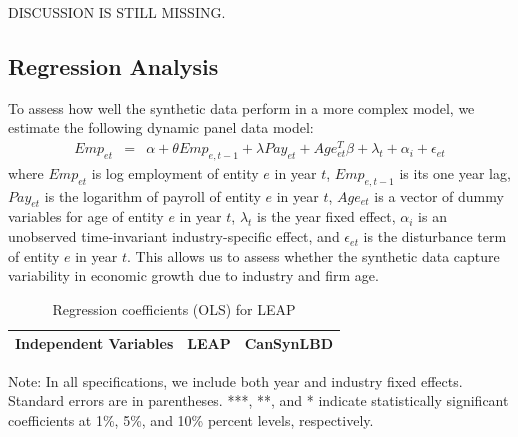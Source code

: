 DISCUSSION IS STILL MISSING.

\subsection{Regression Analysis}

To assess how well the synthetic data perform in a more complex model, we estimate  the following dynamic panel data model:
\begin{eqnarray}	
Emp_{et} & = & \alpha + \theta Emp_{e,t-1} + \lambda Pay_{et} + Age_{et}^{T}\beta + \lambda_t + \alpha_i + \epsilon_{et}
\end{eqnarray}
where $Emp_{et}$ is log employment of entity $e$ in year $t$, $Emp_{e,t-1}$ is its one year lag, $Pay_{et}$ is the logarithm of payroll of entity $e$ in year $t$, $Age_{et}$ is a vector of dummy variables for age of entity $e$ in year $t$, $\lambda_t$ is the year fixed effect, $\alpha_i$ is an unobserved time-invariant industry-specific effect, and $\epsilon_{et}$ is the disturbance term of entity $e$ in year $t$. This allows us to assess whether the synthetic data capture variability in economic growth due to industry and firm age.

\begin{table}[H]
  \centering
\begin{threeparttable}
 \caption{Regression coefficients (OLS) for LEAP} \label{OLS} \medskip
\renewcommand{\arraystretch}{1}
\begin{tabular}{l|c c| c c}
\toprule
\textbf{Independent Variables}&\multicolumn{2}{c|}{\textbf{LEAP}} &  \multicolumn{2}{c}{\textbf{CanSynLBD}}\\
\midrule

   \bottomrule
  \end{tabular} 
\begin{tablenotes}
\small
\item Note: In all specifications, we include both year and industry fixed effects. Standard errors are in parentheses.  ***, **, and * indicate statistically significant coefficients at 1\%, 5\%, and 10\% percent levels, respectively.
 \end{tablenotes}
 \end{threeparttable}
\end{table}

